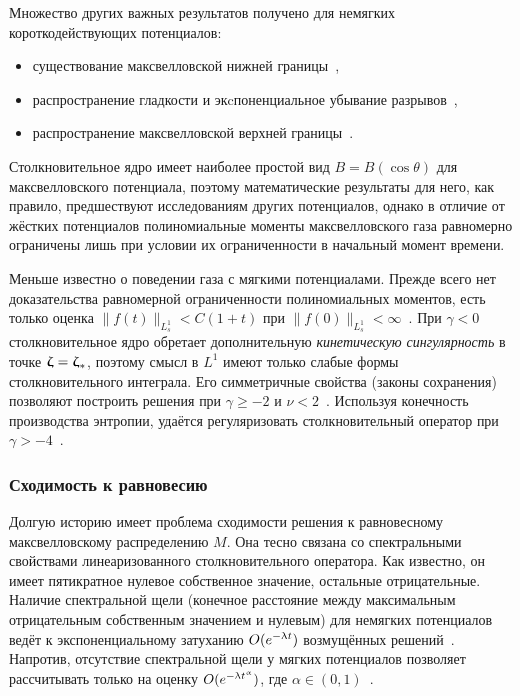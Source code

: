 Множество других важных результатов получено для немягких короткодействующих потенциалов:
\begin{itemize}
    \item существование максвелловской нижней границы~\cite{Pulvirenti1996, Pulvirenti1997},
    \item распространение гладкости и экcпоненциальное убывание разрывов~\cite{Carlen1999, Mouhot2004},
    \item распространение максвелловской верхней границы~\cite{Gamba2009upper, Bobylev2017}.
\end{itemize}
Столкновительное ядро имеет наиболее простой вид \(B = B(\cos\theta)\) для максвелловского потенциала,
поэтому математические результаты для него, как правило, предшествуют исследованиям других потенциалов,
однако в отличие от жёстких потенциалов полиномиальные моменты максвелловского газа равномерно ограничены лишь
при условии их ограниченности в начальный момент времени.

Меньше известно о поведении газа с мягкими потенциалами.
Прежде всего нет доказательства равномерной ограниченности полиномиальных моментов,
есть только оценка \(\|f(t)\|_{L^1_s} < C(1+t)\) при \(\|f(0)\|_{L^1_s} < \infty\)~\cite{Carlen2009}.
При \(\gamma<0\) столкновительное ядро обретает дополнительную \emph{кинетическую сингулярность} в точке \({\boldsymbol{\upzeta}} = {\boldsymbol{\upzeta}}_*\),
поэтому смысл в \(L^1\) имеют только слабые формы столкновительного интеграла.
Его симметричные свойства (законы сохранения) позволяют построить решения при \(\gamma\geq-2\) и \(\nu<2\)~\cite{Arkeryd1981, Goudon1997}.
Используя конечность производства энтропии, удаётся регуляризовать столкновительный оператор при \(\gamma>-4\)~\cite{Villani1998}.

\subsubsection{Сходимость к равновесию}

Долгую историю имеет проблема сходимости решения к равновесному максвелловскому распределению \(M\).
Она тесно связана со спектральными свойствами линеаризованного столкновительного оператора.
Как известно, он имеет пятикратное нулевое собственное значение, остальные отрицательные.
Наличие спектральной щели (конечное расстояние между максимальным отрицательным собственным значением и нулевым)
для немягких потенциалов ведёт к экспоненциальному затуханию \(O(e^{-\uplambda t})\) возмущённых решений~\cite{Grad1963b}.
Напротив, отсутствие спектральной щели у мягких потенциалов позволяет рассчитывать только на оценку \(O(e^{-\uplambda t^\upalpha})\),
где \(\alpha\in(0,1)\)~\cite{Caflisch1980a}.


